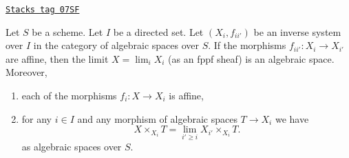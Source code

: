 \begin{lemma}
\label{spaces-limits-lemma-directed-inverse-system-has-limit}
\href{https://stacks.math.columbia.edu/tag/07SF}{\texttt{Stacks tag 07SF}}

Let $S$ be a scheme. Let $I$ be a directed set.
Let $(X_i, f_{ii'})$ be an inverse system over $I$
in the category of algebraic spaces over $S$.
If the morphisms $f_{ii'} : X_i \to X_{i'}$ are affine, then the
limit $X = \lim_i X_i$ (as an fppf sheaf) is an algebraic space.
Moreover,
\begin{enumerate}
\item each of the morphisms $f_i : X \to X_i$ is affine,
\item for any $i \in I$ and any morphism of algebraic spaces
$T \to X_i$ we have
$$
X \times_{X_i} T = \lim_{i' \geq i} X_{i'} \times_{X_i} T.
$$
as algebraic spaces over $S$.
\end{enumerate}
\end{lemma}

